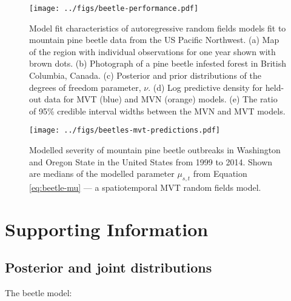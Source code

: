 \documentclass[12pt,english]{article}
\begin{document}
\begin{spacing}{1.3}
\begin{figure}[htb]
  \begin{center}
    \texttt{[image: ../figs/beetle-performance.pdf]}
    \caption{
      Model fit characteristics of autoregressive random fields
      models fit to mountain pine beetle data from the US Pacific Northwest.
      (a) Map of the region with individual observations for one year shown with
      brown dots.
      (b) Photograph of a pine beetle infested forest in British Columbia, Canada.
      (c) Posterior and prior distributions of the degrees of freedom parameter, $\nu$.
      (d) Log predictive density for held-out data for MVT (blue) and MVN (orange) models.
      (e) The ratio of 95\% credible interval widths between the MVN and MVT models.
    }
    \label{fig:map-etc}
  \end{center}
\end{figure}

\clearpage

\begin{figure}[htb]
  \begin{center}
    \texttt{[image: ../figs/beetles-mvt-predictions.pdf]}
    \caption{Modelled severity of mountain pine beetle outbreaks in Washington and
      Oregon State in the United States from 1999 to 2014.
      Shown are medians of the modelled parameter $\mu_{s,t}$ from Equation \ref{eq:beetle-mu}
      --- a spatiotemporal MVT random fields model.
    }
    \label{fig:beetle-pred}
  \end{center}
\end{figure}


\end{spacing}

\clearpage

\section{Supporting Information}

\subsection{Posterior and joint distributions}

The beetle model:
\end{document}
